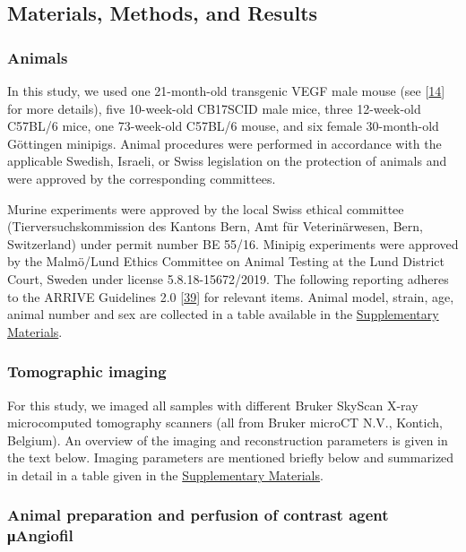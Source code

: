 \hypertarget{materials-methods-and-results}{%
\subsection{Materials, Methods, and Results}\label{materials-methods-and-results}}

\hypertarget{animals}{%
\subsubsection{Animals}\label{animals}}

In this study, we used one 21-month-old transgenic VEGF male mouse (see {[}\protect\hyperlink{ref-nC0ZZVgL}{14}{]} for more details), five 10-week-old CB17SCID male mice, three 12-week-old C57BL/6 mice, one 73-week-old C57BL/6 mouse, and six female 30-month-old Göttingen minipigs.
Animal procedures were performed in accordance with the applicable Swedish, Israeli, or Swiss legislation on the protection of animals and were approved by the corresponding committees.

Murine experiments were approved by the local Swiss ethical committee (Tierversuchskommission des Kantons Bern, Amt für Veterinärwesen, Bern, Switzerland) under permit number BE 55/16.
Minipig experiments were approved by the Malmö/Lund Ethics Committee on Animal Testing at the Lund District Court, Sweden under license 5.8.18-15672/2019.
The following reporting adheres to the ARRIVE Guidelines 2.0 {[}\protect\hyperlink{ref-1ppOkyPO}{39}{]} for relevant items.
Animal model, strain, age, animal number and sex are collected in a table available in the \protect\hyperlink{supplementary-materials}{Supplementary Materials}.

\hypertarget{tomographic-imaging}{%
\subsubsection{Tomographic imaging}\label{tomographic-imaging}}

For this study, we imaged all samples with different Bruker SkyScan X-ray microcomputed tomography scanners (all from Bruker microCT N.V., Kontich, Belgium).
An overview of the imaging and reconstruction parameters is given in the text below.
Imaging parameters are mentioned briefly below and summarized in detail in a table given in the \protect\hyperlink{supplementary-materials}{Supplementary Materials}.

\hypertarget{animal-preparation-and-perfusion-of-contrast-agent-ux3bcangiofil}{%
\subsubsection{Animal preparation and perfusion of contrast agent μAngiofil}\label{animal-preparation-and-perfusion-of-contrast-agent-ux3bcangiofil}}


